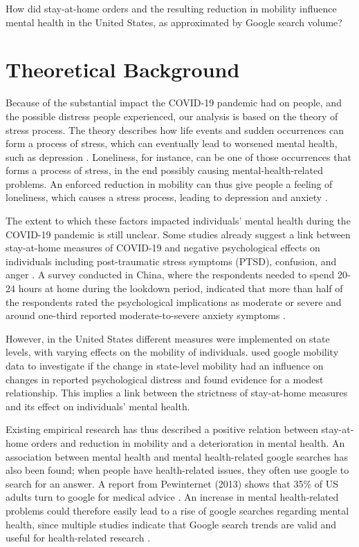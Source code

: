 How did stay-at-home orders and the resulting reduction in mobility influence mental health in the United States, as approximated by Google search volume?
\\


\section{Theoretical Background}
Because of the substantial impact the COVID-19 pandemic had on people, and the possible distress people experienced, our analysis is based on the theory of stress process. The theory describes how life events and sudden occurrences can form a process of stress, which can eventually lead to worsened mental health, such as depression \citep{Pearlin1981}. Loneliness, for instance, can be one of those occurrences that forms a process of stress, in the end possibly causing mental-health-related problems\citep{Wang2017}. An enforced reduction in mobility can thus give people a feeling of loneliness, which causes a stress process, leading to depression and anxiety \citep{Devaraj2021}.

The extent to which these factors impacted individuals’ mental health during the COVID-19 pandemic is still unclear. Some studies already suggest a link between stay-at-home measures of COVID-19 and negative psychological effects on individuals including post-traumatic stress symptoms (PTSD), confusion, and anger \citep{BROOKS2020912}. A survey conducted in China, where the respondents needed to spend 20-24 hours at home during the lookdown period, indicated that more than half of the respondents rated the psychological implications as moderate or severe and around one-third reported moderate-to-severe anxiety symptoms \citep{Wang2020}. 

However, in the United States different measures were implemented on state levels, with varying effects on the mobility of individuals.\citep{Devaraj2021} used google mobility data to investigate if the change in state-level mobility had an influence on changes in reported psychological distress and found evidence for a modest relationship. This implies a link between the strictness of stay-at-home measures and its effect on individuals' mental health. 

Existing empirical research has thus described a positive relation between stay-at-home orders and reduction in mobility and a deterioration in mental health. An association between mental health and mental health-related google searches has also been found; when people have health-related issues, they often use google to search for an answer. A report from Pewinternet (2013) shows that 35\% of US adults turn to google for medical advice \citep{Fox2013}. An increase in mental health-related problems could therefore easily lead to a rise of google searches regarding mental health, since multiple studies indicate that Google search trends are valid and useful for health-related research \citep{Ghosh2021}.

